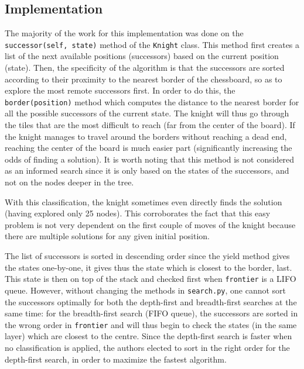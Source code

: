 \documentclass[journal]{IEEEtran}
\newcommand{\py}[1]{\texttt{#1}}
\begin{document}
 \subsection{Implementation}
 The majority of the work for this implementation was done on the \py{successor(self, state)} method of the \py{Knight} class.
 This method first creates a list of the next available positions (successors) based on the current position (state).
 Then, the specificity of the algorithm is that the successors are sorted according to their proximity to the nearest border of the chessboard, so as to explore the most remote successors first.
 In order to do this, the \py{border(position)} method which computes the distance to the nearest border for all the possible successors of the current state.
 The knight will thus go through the tiles that are the most difficult to reach (far from the center of the board).
 If the knight manages to travel around the borders without reaching a dead end, reaching the center of the board is much easier part (significantly increasing the odds of finding a solution).
 It is worth noting that this method is not considered as an informed search since it is only based on the states of the successors, and not on the nodes deeper in the tree.
 
 With this classification, the knight sometimes even directly finds the solution (having explored only 25 nodes).
 This corroborates the fact that this easy problem is not very dependent on the first couple of moves of the knight because there are multiple solutions for any given initial position.
 
 The list of successors is sorted in descending order since the yield method gives the states one-by-one, it gives thus the state which is closest to the border, last.
 This state is then on top of the stack and checked first when \py{frontier} is a LIFO queue.
 However, without changing the methods in \py{search.py}, one cannot sort the successors optimally for both the depth-first and breadth-first searches at the same time: for the breadth-first search (FIFO queue), the successors are sorted in the wrong order in \py{frontier} and will thus begin to check the states (in the same layer) which are closest to the centre.
 Since the depth-first search is faster when no classification is applied, the authors elected to sort in the right order for the depth-first search, in order to maximize the fastest algorithm.
\end{document}
